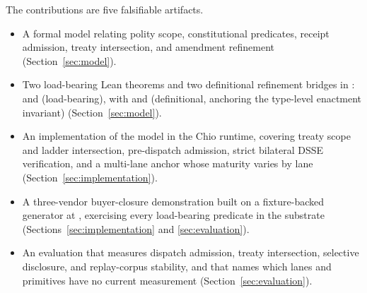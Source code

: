 The contributions are five falsifiable artifacts.

\begin{itemize}[noitemsep,topsep=2pt,leftmargin=1.2em]
  \item A formal model relating polity scope, constitutional predicates, receipt admission, treaty intersection, and amendment refinement (Section~\ref{sec:model}).
  \item Two load-bearing Lean theorems and two definitional refinement bridges in :  and  (load-bearing), with  and  (definitional, anchoring the type-level enactment invariant) (Section~\ref{sec:model}).
  \item An implementation of the model in the Chio runtime, covering treaty scope and ladder intersection, pre-dispatch admission, strict bilateral DSSE verification, and a multi-lane anchor whose maturity varies by lane (Section~\ref{sec:implementation}).
  \item A three-vendor buyer-closure demonstration built on a fixture-backed generator at , exercising every load-bearing predicate in the substrate (Sections~\ref{sec:implementation} and \ref{sec:evaluation}).
  \item An evaluation that measures dispatch admission, treaty intersection, selective disclosure, and replay-corpus stability, and that names which lanes and primitives have no current measurement (Section~\ref{sec:evaluation}).
\end{itemize}
